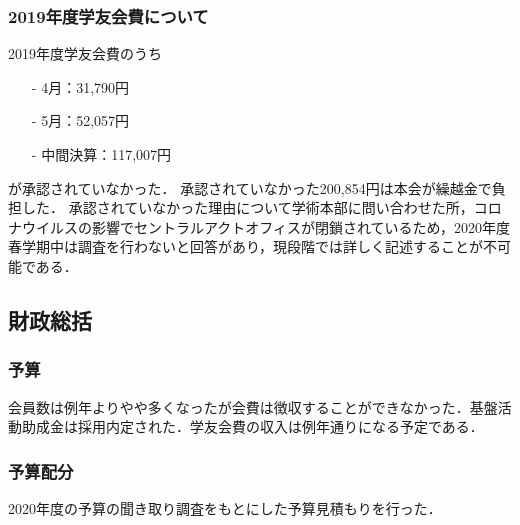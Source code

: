 \subsubsection*{2019年度学友会費について}
2019年度学友会費のうち
\begin{itemize}
	\item[-]4月：31,790円
	\item[-]5月：52,057円
	\item[-]中間決算：117,007円
\end{itemize}
が承認されていなかった．
承認されていなかった200,854円は本会が繰越金で負担した．
承認されていなかった理由について学術本部に問い合わせた所，コロナウイルスの影響でセントラルアクトオフィスが閉鎖されているため，2020年度春学期中は調査を行わないと回答があり，現段階では詳しく記述することが不可能である．


\subsection*{財政総括}


\subsubsection*{予算}
会員数は例年よりやや多くなったが会費は徴収することができなかった．基盤活動助成金は採用内定された．学友会費の収入は例年通りになる予定である．

\subsubsection*{予算配分}
2020年度の予算の聞き取り調査をもとにした予算見積もりを行った．
